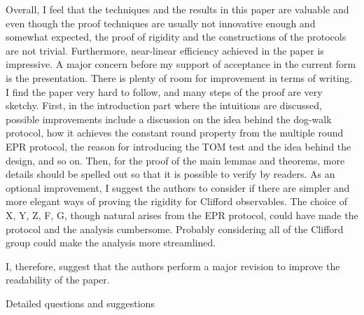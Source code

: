\documentclass[12pt]{article}
\begin{document}
Overall, I feel that the techniques and the results in this paper are valuable and even though the proof techniques are usually not innovative enough and somewhat expected, the proof of rigidity and the constructions of the protocols are not trivial. Furthermore, near-linear efficiency achieved in the paper is impressive. 
A major concern before my support of acceptance in the current form is the presentation. There is plenty of room for improvement in terms of writing. I find the paper very hard to follow, and many steps of the proof are very sketchy. First, in the introduction part where the intuitions are discussed, possible improvements include a discussion on the idea behind the dog-walk protocol, how it achieves the constant round property from the multiple round EPR protocol, the reason for introducing the TOM test and the idea behind the design, and so on. Then, for the proof of the main lemmas and theorems, more details should be spelled out so that it is possible to verify by readers. As an optional improvement, I suggest the authors to consider if there are simpler and more elegant ways of proving the rigidity for Clifford observables. The choice of {X, Y, Z, F, G}, though natural arises from the EPR protocol, could have made the protocol and the analysis cumbersome. Probably considering all of the Clifford group could make the analysis more streamlined.

I, therefore, suggest that the authors perform a major revision to improve the readability of the paper.


Detailed questions and suggestions
\end{document}
